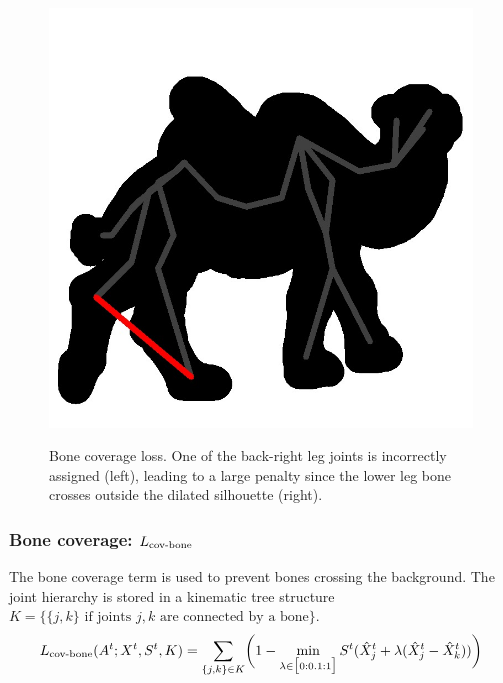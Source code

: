 \begin{figure}[t!]
\begin{floatrow}
{{    \includegraphics[trim={0cm 0cm 0cm 0cm},clip,width=0.45\linewidth]{bone_coverage/bone_error_overlay_cropped.jpg}
    }
}
{\caption{Bone coverage loss. One of the back-right leg joints is incorrectly assigned (left), leading to a large penalty since the lower leg bone crosses outside the dilated silhouette (right).}
\label{fig:cov-bone}
}
\end{floatrow}
\end{figure}

\subsubsection{Bone coverage: $L_{\textrm{cov-bone}}$}

The bone coverage term is used to prevent bones crossing the background. The joint hierarchy is stored in a kinematic tree structure $K = \{\{j,k\} \text{ if joints } j, k \text{ are connected by a bone}\}$.
\begin{equation}
L_{\textrm{cov-bone}}(A^{t};X^{t},S^{t},K) = \sum_{\{j,k\} \in K}\biggl(1 - \min_{\lambda \in \big[0:0.1:1\big]}S^{t}(\hat{X}_{j}^{t} + \lambda(\hat{X}_{j}^{t} - \hat{X}_{k}^{t}))\biggr)
\end{equation}

\begin{figure}[t!]
    
\end{figure}

